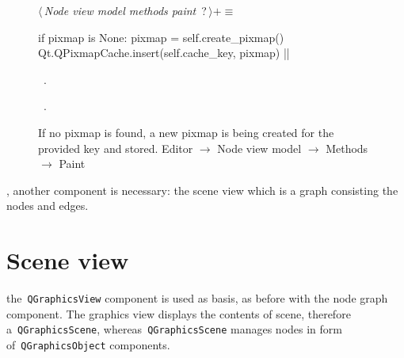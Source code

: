 \documentclass[%
    a4paper,    %
    justified,  %
    nobib,      %
    openany     %
]{tufte-book}
\begin{document}
\begin{figure}
\begin{flushleft} \small
\begin{minipage}{\linewidth}\label{scrap80}\raggedright\small
{} $\langle\,${\itshape Node view model methods paint}\nobreak\ {\footnotesize {?}}$\,\rangle+\equiv$
\vspace{-1ex}
\begin{pythoncode}
    if pixmap is None:
        pixmap = self.create_pixmap()
        Qt.QPixmapCache.insert(self.cache_key, pixmap)
|\NWsep|
\end{pythoncode}
\vspace{1.5ex}
\footnotesize
\begin{list}{}{\setlength{\itemsep}{-\parsep}\setlength{\itemindent}{-\leftmargin}}
\item \NWtxtMacroDefBy\ .
\item \NWtxtMacroRefIn\ .

\item{}
\end{list}
\end{minipage}\vspace{4ex}
\end{flushleft}
\caption{If no pixmap is found, a new pixmap is being created for the provided
  key and stored.
  \newline{}\newline{}Editor $\rightarrow$ Node view model $\rightarrow$
  Methods $\rightarrow$ Paint}
\label{editor:lst:node-view-model:methods:paint:create-pixmap}
\end{figure}

, another component is necessary:
the scene view which is a graph consisting the nodes and edges.

\chapter{Scene view}
\label{appendix:chap:scene-view}

 the~\verb=QGraphicsView= component
is used as basis, as before with the node graph component. The graphics view
displays the contents of scene, therefore a~\verb=QGraphicsScene=,
whereas~\verb=QGraphicsScene= manages nodes in form of~\verb=QGraphicsObject=
components.
\end{document}
